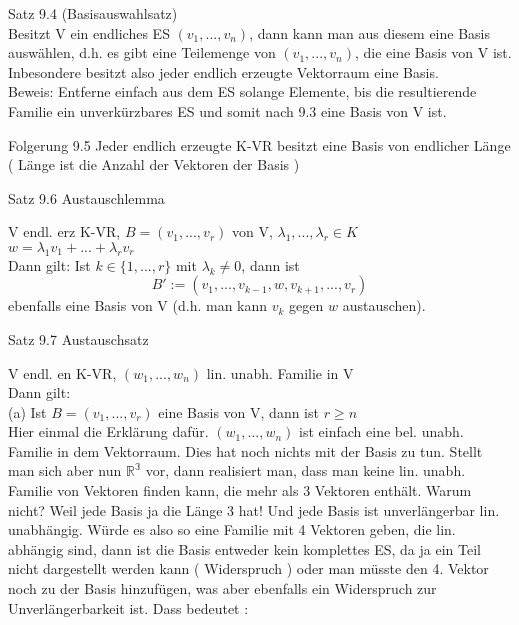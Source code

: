 \documentclass[headsepline,12pt,a4paper]{scrartcl}
\begin{document}
\item[Satz 9.4]
(Basisauswahlsatz) \\
Besitzt V ein endliches ES $(v_1,...,v_n)$, dann kann man aus diesem eine Basis auswählen, d.h. es gibt eine Teilemenge von $(v_1,...,v_n)$, die eine Basis von V ist. \\
Inbesondere besitzt also jeder endlich erzeugte Vektorraum eine Basis. \\
Beweis: Entferne einfach aus dem ES solange Elemente, bis die resultierende Familie ein unverkürzbares ES und somit nach 9.3 eine Basis von V ist. \\

\item[Folgerung 9.5] 
Jeder endlich erzeugte K-VR besitzt eine Basis von endlicher Länge ( Länge ist die Anzahl der Vektoren der Basis )

\newpage

\begin{center}
\item[Satz 9.6 Austauschlemma]
\end{center}
V endl. erz K-VR, $B = (v_1,...,v_r) $ von V, $ \lambda_1,...,\lambda_r \in K$\\
$w = \lambda_1 v_1+...+ \lambda_r v_r $\\
Dann gilt: Ist $k\in \{1,...,r\}$ mit $\lambda_k \neq 0 $, dann ist \\
$$ B' := (v_1,...,v_{k-1},w,v_{k+1},...,v_r) $$
ebenfalls eine Basis von V (d.h. man kann $v_k$ gegen $w$ austauschen).\\

\newpage


\begin{center}
\item[Satz 9.7 Austauschsatz]
\end{center}

V endl. en K-VR, $(w_1,...,w_n)$ lin. unabh. Familie in V \\
Dann gilt: \\

(a) Ist $B = (v_1,...,v_r) $ eine Basis von V, dann ist $r\geq n$ \\

Hier einmal die Erklärung dafür. $(w_1,...,w_n)$ ist einfach eine bel. unabh. Familie in dem Vektorraum. Dies hat noch nichts mit der Basis zu tun. Stellt man sich aber nun $\mathbb{R^3}$ vor, dann realisiert man, dass man keine lin. unabh. Familie von Vektoren finden kann, die mehr als 3 Vektoren enthält. Warum nicht? Weil jede Basis ja die Länge 3 hat! Und jede Basis ist unverlängerbar lin. unabhängig. Würde es also so eine Familie mit 4 Vektoren geben, die lin. abhängig sind, dann ist die Basis entweder kein komplettes ES, da ja ein Teil nicht dargestellt werden kann ( Widerspruch ) oder man müsste den 4. Vektor noch zu der Basis hinzufügen, was aber ebenfalls ein Widerspruch zur Unverlängerbarkeit ist. Dass bedeutet : \\
\end{document}
